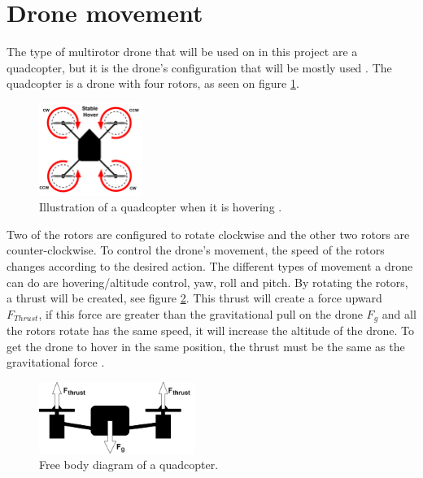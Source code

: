 \section{Drone movement}
The type of multirotor drone that will be used on in this project are a quadcopter, but it is the drone's configuration that will be mostly used \cite{PhysicsofDroneFlight}. The quadcopter is a drone with four rotors, as seen on figure \ref{fig:dronePhysics_1}.
\begin{figure}[H]
    \centering
    \includegraphics[width=0.3\textwidth]{figures/ch_intro/physics-of-multirotor.png}
    \caption{Illustration of a quadcopter when it is hovering \cite[Redrawn]{PhysicsofDroneFlight}.}
    \label{fig:dronePhysics_1}
\end{figure}
Two of the rotors are configured to rotate clockwise and the other two rotors are counter-clockwise. To control the drone’s movement, the speed of the rotors changes according to the desired action. The different types of movement a drone can do are hovering/altitude control, yaw, roll and pitch.
\newline
\newline
By rotating the rotors, a thrust will be created, see figure \ref{fig:QC_freeBodyDiagram}. This thrust will create a force upward $F_{Thrust}$, if this force are greater than the gravitational pull on the drone $F_g$ and all the rotors rotate has the same speed, it will increase the altitude of the drone. To get the drone to hover in the same position, the thrust must be the same as the gravitational force \cite{PhysicsofDroneFlight}.
\begin{figure}[h]
    \centering
    \includegraphics[width=0.45\textwidth]{figures/ch_intro/droen_frit_legeme-diagram.png}
    \caption{Free body diagram of a quadcopter.}
    \label{fig:QC_freeBodyDiagram}
\end{figure}

